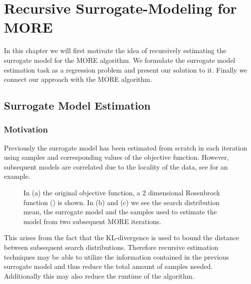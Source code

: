 
\chapter{Recursive Surrogate-Modeling for MORE}
In this chapter we will first motivate the idea of recursively
estimating the surrogate model for the MORE algorithm.
We formulate the surrogate model estimation task
as a regression problem and present our solution to it.
Finally we connect our approach with the MORE algorithm.

\section{Surrogate Model Estimation}
\label{sec:surrogate}
\subsection{Motivation}
Previously the surrogate model has been estimated from scratch in each
iteration using samples and corresponding
values of the objective function. 
However, subsequent models are correlated
due to the locality of the data, see  for an example.
\begin{figure}[t]
  \centering
  \caption{\small
    In (a) the original objective function,
    a 2 dimensional Rosenbrock function () is shown.
    In (b) and (c) we see the search distribution mean,
    the surrogate model and the samples used to estimate
    the model from two subsequent MORE iterations.}
 \label{fig:sur_model}
\end{figure}
This arises from the fact that the KL-divergence is
used to bound the distance between
subsequent search distributions. Therefore recursive estimation
techniques may be able to utilize the information contained in the previous
surrogate model and thus reduce the total amount of samples needed.
Additionally this may also reduce the runtime of the algorithm.

